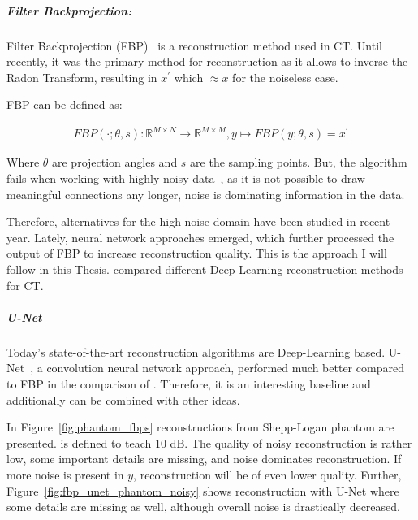 \subparagraph{Filter Backprojection:}
Filter Backprojection (FBP)~\cite{tomographicReconstruction} is a reconstruction method used in CT.
Until recently, it was the primary method for reconstruction as it allows to inverse the Radon Transform, resulting in 
$x^{\prime}$ which $ \approx x$ for the noiseless case. 

FBP can be defined as:

\begin{equation}
    \label{eq:fbp}
    \begin{aligned}
        \textit{FBP}(\cdot; \theta, s) : \mathbb{R}^{M \times N} \to\mathbb{R}^{M \times M}, y \mapsto \textit{FBP}(y; \theta, s) = x^{\prime}
    \end{aligned}
\end{equation}

Where $\theta$ are projection angles and $s$ are the sampling points.
But, the algorithm fails when working with highly noisy data~\cite{cryoEmMath2}, as it is not possible to draw meaningful
connections any longer, noise
is dominating information in the data.

Therefore, alternatives for the high noise domain have been studied in recent year.
Lately, neural network approaches emerged, which further processed the output of FBP to increase reconstruction quality.
This is the approach I will follow in this Thesis. \citet{ct-reconstruction-comparison} compared different 
Deep-Learning reconstruction methods for CT. 

\subparagraph{U-Net}
Today's state-of-the-art reconstruction algorithms are Deep-Learning based.
U-Net~\cite{unet-tomography}, a convolution neural network approach, performed
much better compared to FBP in the comparison of \citet{ct-reconstruction-comparison}.
Therefore, it is an interesting baseline and additionally can be combined with other ideas.

In Figure~\ref{fig:phantom_fbps} reconstructions from Shepp-Logan phantom are presented.
\snry is defined to teach 10 dB.
The quality of noisy reconstruction is rather low, some important details are missing, and noise dominates reconstruction.
If more noise is present in $y$, reconstruction will be of even lower quality.
Further, Figure~\ref{fig:fbp_unet_phantom_noisy} 
shows reconstruction with U-Net where some details are missing as well, although overall noise is drastically decreased.


